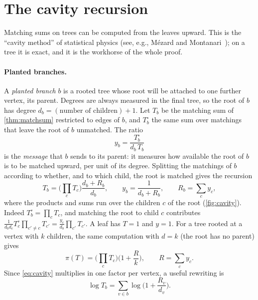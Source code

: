 \documentclass[11pt]{article}
\theoremstyle{definition}
\begin{document}
\section{The cavity recursion}\label{sec:cavity}

Matching sums on trees can be computed from the leaves upward. This is the ``cavity method'' of
statistical physics (see, e.g., Mézard and Montanari~\cite{MM2009}); on a tree it is exact, and it is the
workhorse of the whole proof.

\paragraph{Planted branches.} A \emph{planted branch} $b$ is a rooted tree whose root will be attached to
one further vertex, its parent. Degrees are always measured in the final tree, so the root of $b$ has
degree $d_b=(\text{number of children})+1$. Let $T_b$ be the matching sum of \cref{thm:matchsum}
restricted to edges of $b$, and $T^{\circ}_b$ the same sum over matchings that leave the root of $b$
unmatched. The ratio
\[
  y_b=\frac{T^{\circ}_b}{d_b\,T_b}
\]
is the \emph{message} that $b$ sends to its parent: it measures how available the root of $b$ is to be
matched upward, per unit of its degree. Splitting the matchings of $b$ according to whether, and to
which child, the root is matched gives the recursion
\begin{equation}\label{eq:cavity}
  T_b=\Big(\prod_{c}T_c\Big)\frac{d_b+R_b}{d_b},\qquad
  y_b=\frac{1}{d_b+R_b},\qquad R_b=\sum_c y_c,
\end{equation}
where the products and sums run over the children $c$ of the root (\cref{fig:cavity}). Indeed
$T^{\circ}_b=\prod_cT_c$, and matching the root to child $c$ contributes
$\frac{1}{d_bd_c}T^{\circ}_c\prod_{c'\neq c}T_{c'}=\frac{y_c}{d_b}\prod_{c'}T_{c'}$. A leaf has $T=1$
and $y=1$. For a tree rooted at a vertex with $k$ children, the same computation with $d=k$ (the root has
no parent) gives
\begin{equation}\label{eq:root}
  \pi(T)=\Big(\prod_{c}T_c\Big)\Big(1+\frac{R}{k}\Big),\qquad R=\sum_c y_c .
\end{equation}
Since \eqref{eq:cavity} multiplies in one factor per vertex, a useful rewriting is
\begin{equation}\label{eq:logsum}
  \log T_b=\sum_{v\in b}\log\Big(1+\frac{R_v}{d_v}\Big).
\end{equation}
\end{document}
